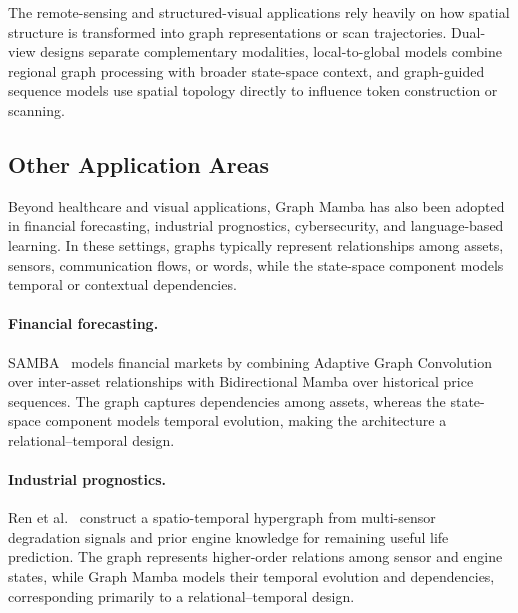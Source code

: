 \documentclass[acmsmall]{acmart}
\begin{document}
The remote-sensing and structured-visual applications rely heavily on how
spatial structure is transformed into graph representations or scan
trajectories. Dual-view designs separate complementary modalities, local-to-global
models combine regional graph processing with broader state-space context, and
graph-guided sequence models use spatial topology directly to influence token
construction or scanning.

\subsection{Other Application Areas}
\label{sec:other-areas}

Beyond healthcare and visual applications, Graph Mamba has also been adopted
in financial forecasting, industrial prognostics, cybersecurity, and
language-based learning. In these settings, graphs typically represent
relationships among assets, sensors, communication flows, or words, while the
state-space component models temporal or contextual dependencies.

\paragraph{\textbf{Financial forecasting.}}
SAMBA~\cite{mehrabian2024mamba} models financial markets by combining
Adaptive Graph Convolution over inter-asset relationships with Bidirectional
Mamba over historical price sequences. The graph captures dependencies among
assets, whereas the state-space component models temporal evolution, making the
architecture a relational--temporal design.


\paragraph{\textbf{Industrial prognostics.}}
Ren et al.~\cite{ren2026spatio} construct a spatio-temporal hypergraph from
multi-sensor degradation signals and prior engine knowledge for remaining
useful life prediction. The graph represents higher-order relations among
sensor and engine states, while Graph Mamba models their temporal evolution and
dependencies, corresponding primarily to a relational--temporal design.
\end{document}
